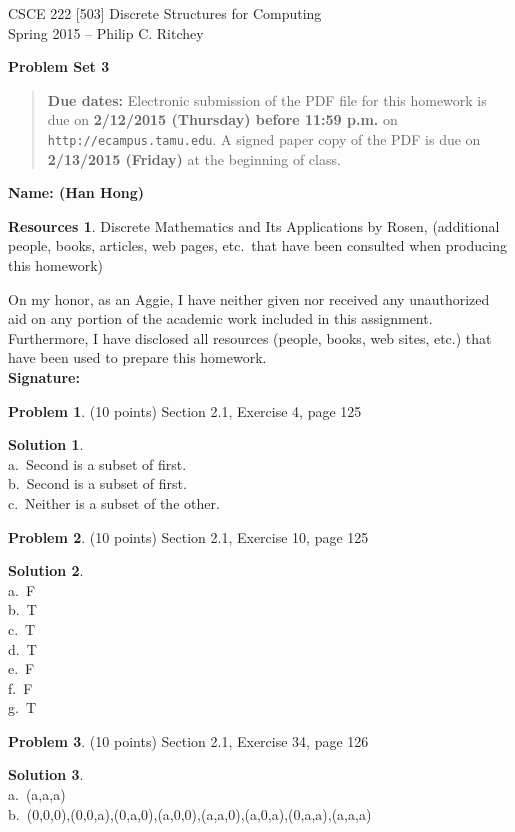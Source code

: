 \documentclass{article}
\theoremstyle{definition}
\newtheorem{problem}{Problem}
\newtheorem*{solution}{Solution}
\newtheorem*{resources}{Resources}
\newcommand{\name}[1]{\noindent\textbf{Name: #1}}
\newcommand{\honor}{\noindent On my honor, as an Aggie, I have neither given nor received any unauthorized aid on any portion of the academic work included in this assignment. Furthermore, I have disclosed all resources (people, books, web sites, etc.) that have been used to prepare this homework. 
\\[2ex]
\textbf{Signature:} \underline{\hspace*{7cm}} }
\newcommand{\problemset}[1]{\begin{center}\textbf{Problem Set #1}\end{center}}
\newcommand{\duedate}[2]{\begin{quote}\textbf{Due dates:} Electronic
    submission of the PDF file for this homework is due on
    \textbf{#1} on \texttt{http://ecampus.tamu.edu}.  A signed paper copy of the PDF is due on
    \textbf{#2} at the beginning of class.\end{quote} }
\begin{document}
\begin{center}
{\large
CSCE 222 [503] Discrete Structures for Computing\\[.5ex]
Spring 2015 -- Philip C. Ritchey\\}
\end{center}

\problemset{3}

\duedate{2/12/2015 (Thursday) before 11:59 p.m.}{2/13/2015 (Friday)}

\name{ (Han Hong) }

\begin{resources} Discrete Mathematics and Its Applications by Rosen, (additional people, books, articles, web pages, etc.\ that
  have been consulted when producing this homework)
\end{resources}

\honor

\bigskip

\begin{problem} (10 points)
Section 2.1, Exercise 4, page 125
\end{problem}
\begin{solution}~\\
a.\ Second is a subset of first. \\
b.\ Second is a subset of first. \\
c.\ Neither is a subset of the other. \\
\end{solution}

\begin{problem} (10 points)
Section 2.1, Exercise 10, page 125
\end{problem}
\begin{solution}~\\
a.\ F \\
b.\ T \\ 
c.\ T \\
d.\ T \\
e.\ F \\
f.\ F \\
g.\ T \\
\end{solution}

\begin{problem} (10 points)
Section 2.1, Exercise 34, page 126
\end{problem}
\begin{solution}~\\
a.\ {(a,a,a)} \\
b.\ {(0,0,0),(0,0,a),(0,a,0),(a,0,0),(a,a,0),(a,0,a),(0,a,a),(a,a,a)} \\
\end{solution}
\end{document}
